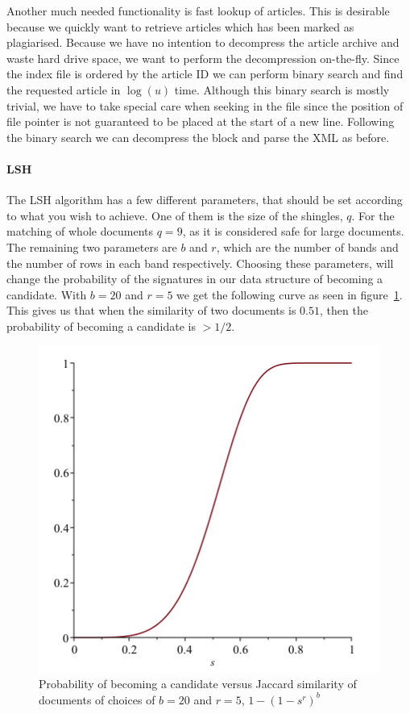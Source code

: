 Another much needed functionality is fast lookup of articles. This is desirable because we quickly want to retrieve articles which has been marked as plagiarised. Because we have no intention to decompress the article archive and waste hard drive space, we want to perform the decompression on-the-fly. Since the index file is ordered by the article ID we can perform binary search and find the requested article in $\log(u)$ time. Although this binary search is mostly trivial, we have to take special care when seeking in the file since the position of file pointer is not guaranteed to be placed at the start of a new line. Following the binary search we can decompress the block and parse the XML as before.

\paragraph{LSH}

The LSH algorithm has a few different parameters, that should be set according to what you wish to achieve. One of them is the size of the shingles, $q$. For the matching of whole documents $q = 9$, as it is considered safe for large documents\cite{leskovec2014mining}. The remaining two parameters are $b$ and $r$, which are the number of bands and the number of rows in each band respectively. Choosing these parameters, will change the probability of the signatures in our data structure of becoming a candidate. With $b=20$ and $r=5$ we get the following curve as seen in figure~\ref{fig:lsh}. This gives us that when the similarity of two documents is $0.51$, then the probability of becoming a candidate is $>1/2$.

\begin{figure}[h]
	\centering
    \includegraphics[width = 0.4\linewidth]{docs/report/input/lsh.png}
    \captionsetup{width = \linewidth}
    \caption{Probability of becoming a candidate versus Jaccard similarity of documents of choices of $b=20$ and $r=5$, $1-(1-s^r)^b$}
    \label{fig:lsh}
\end{figure}

